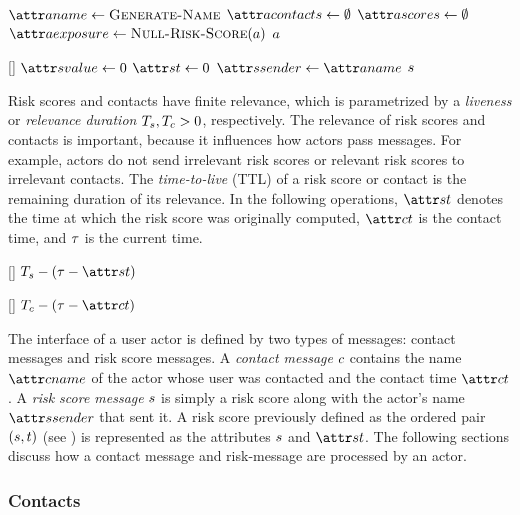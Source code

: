 %
\begin{function}{\nCreateActor}
    \State $\aActorName \assign \cGenerateName$
    \State $\aActorContacts \assign \emptyset$
    \State $\aActorScores \assign \emptyset$
    \State $\aActorExposure \assign \cNullRiskScore[\vActor]$
    \State \Return $a$
\end{function}
%
\begin{function}{\nNullRiskScore}[\vActor]
    \State $\aScoreValue \assign 0$
    \State $\aScoreTime \assign 0$
    \State $\aScoreSender \assign \aActorName$
    \State \Return $s$
\end{function}
%
Risk scores and contacts have finite relevance, which is parametrized by a \emph{liveness} or \emph{relevance duration} $T_s, T_c > 0$, respectively. The relevance of risk scores and contacts is important, because it influences how actors pass messages. For example, actors do not send irrelevant risk scores or relevant risk scores to irrelevant contacts. The \emph{time-to-live} (TTL) of a risk score or contact is the remaining duration of its relevance. In the following operations, $\aScoreTime$ denotes the time at which the risk score was originally computed, $\aContactTime$ is the contact time, and $\tau$ is the current time.
%
\begin{function}{\nRiskScoreTtl}[\vScore]
    \State \Return $\pScoreExpiry - (\vRefTime - \aScoreTime)$
\end{function}
\begin{function}{\nContactTtl}[\vContact]
    \State \Return $\pContactExpiry - (\vRefTime - \aContactTime)$
\end{function}
%
The interface of a user actor is defined by two types of messages: contact messages and risk score messages. A \emph{contact message} $c$ contains the name $\aContactName$ of the actor whose user was contacted and the contact time $\aContactTime$. A \emph{risk score message} $s$ is simply a risk score along with the actor's name $\aScoreSender$ that sent it. A risk score previously defined as the ordered pair $(s, t)$ (see ) is represented as the attributes $s$ and $\aScoreTime$. The following sections discuss how a contact message and risk-message are processed by an actor.

\subsubsection{Contacts}

